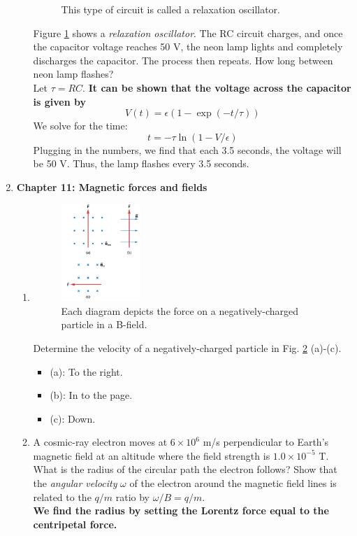 \documentclass[10pt]{article}
\begin{document}
\begin{enumerate}
\begin{enumerate}
\begin{figure}[ht]
\caption{\label{fig:circuit3} This type of circuit is called a relaxation oscillator.}
\end{figure}
Figure \ref{fig:circuit3} shows a \textit{relaxation oscillator}.  The RC circuit charges, and once the capacitor voltage reaches 50 V, the neon lamp lights and completely discharges the capacitor.  The process then repeats.  How long between neon lamp flashes? \\ Let $\tau = RC$.  \textbf{It can be shown that the voltage across the capacitor is given by}
\begin{equation}
V(t) = \epsilon\left(1 - \exp\left(-t/\tau\right)\right)
\end{equation}
We solve for the time:
\begin{equation}
t = -\tau \ln\left( 1 - V/\epsilon \right)
\end{equation}
Plugging in the numbers, we find that each 3.5 seconds, the voltage will be 50 V.  Thus, the lamp flashes every 3.5 seconds.
\end{enumerate}
\item \textbf{Chapter 11: Magnetic forces and fields}
\begin{enumerate}
\item 
\begin{figure}[ht]
\centering
\includegraphics[width=0.3\textwidth]{lorentz1.png}
\caption{\label{fig:lorentz1} Each diagram depicts the force on a negatively-charged particle in a B-field.}
\end{figure}
Determine the velocity of a negatively-charged particle in Fig. \ref{fig:lorentz1} (a)-(c). \\ \begin{itemize}
\item (a): To the right.
\item (b): In to the page.
\item (c): Down.
\end{itemize}
\item A cosmic-ray electron moves at $6 \times 10^6$ m/s perpendicular to Earth’s magnetic field at an altitude where the field strength is $1.0 \times 10^{-5}$ T. What is the radius of the circular path the electron follows?  Show that the \textit{angular velocity} $\omega$ of the electron around the magnetic field lines is related to the $q/m$ ratio by $\omega/B = q/m$. \\ \textbf{We find the radius by setting the Lorentz force equal to the centripetal force.}

\end{enumerate}
\end{enumerate}
\end{document}
